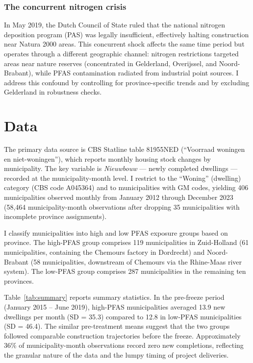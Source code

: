 \documentclass[12pt]{article}
\begin{document}
\subsubsection*{The concurrent nitrogen crisis} In May 2019, the Dutch Council of State ruled that the national nitrogen deposition program (PAS) was legally insufficient, effectively halting construction near Natura 2000 areas. This concurrent shock affects the same time period but operates through a different geographic channel: nitrogen restrictions targeted areas near nature reserves (concentrated in Gelderland, Overijssel, and Noord-Brabant), while PFAS contamination radiated from industrial point sources. I address this confound by controlling for province-specific trends and by excluding Gelderland in robustness checks.

\section{Data}

The primary data source is CBS Statline table 81955NED (``Voorraad woningen en niet-woningen''), which reports monthly housing stock changes by municipality. The key variable is \textit{Nieuwbouw} --- newly completed dwellings --- recorded at the municipality-month level. I restrict to the ``Woning'' (dwelling) category (CBS code A045364) and to municipalities with GM codes, yielding 406 municipalities observed monthly from January 2012 through December 2023 (58,464 municipality-month observations after dropping 35 municipalities with incomplete province assignments).

I classify municipalities into high and low PFAS exposure groups based on province. The high-PFAS group comprises 119 municipalities in Zuid-Holland (61 municipalities, containing the Chemours factory in Dordrecht) and Noord-Brabant (58 municipalities, downstream of Chemours via the Rhine-Maas river system). The low-PFAS group comprises 287 municipalities in the remaining ten provinces.

Table~\ref{tab:summary} reports summary statistics. In the pre-freeze period (January 2015 -- June 2019), high-PFAS municipalities averaged 13.9 new dwellings per month (SD = 35.3) compared to 12.8 in low-PFAS municipalities (SD = 46.4). The similar pre-treatment means suggest that the two groups followed comparable construction trajectories before the freeze. Approximately 36\% of municipality-month observations record zero new completions, reflecting the granular nature of the data and the lumpy timing of project deliveries.
\end{document}
